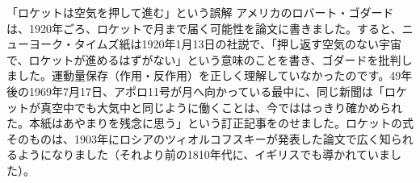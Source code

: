 \begin{column}{「ロケットは空気を押して進む」という誤解}
アメリカのロバート・ゴダードは、1920年ごろ、ロケットで月まで届く可能性を論文に書きました。すると、ニューヨーク・タイムズ紙は1920年1月13日の社説で、「押し返す空気のない宇宙で、ロケットが進めるはずがない」という意味のことを書き、ゴダードを批判しました。運動量保存（作用・反作用）を正しく理解していなかったのです。49年後の1969年7月17日、アポロ11号が月へ向かっている最中に、同じ新聞は「ロケットが真空中でも大気中と同じように働くことは、今でははっきり確かめられた。本紙はあやまりを残念に思う」という訂正記事をのせました。ロケットの式そのものは、1903年にロシアのツィオルコフスキーが発表した論文で広く知られるようになりました（それより前の1810年代に、イギリスでも導かれていました）。
\end{column}

